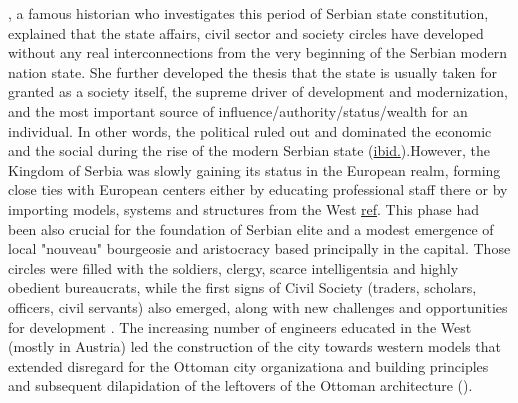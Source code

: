 \documentclass[11pt]{report}
\begin{document}
\href{Stojanovic}{\cite{stojanovic_ulje_2010}}, a famous historian who investigates this period of Serbian state constitution, explained that the state affairs, civil sector and society circles have developed without any real interconnections from the very beginning of the Serbian modern nation state. She further developed the thesis that the state is usually taken for granted as a society itself, the supreme driver of development and modernization, and the most important source of influence/authority/status/wealth for an individual. In other words, the political ruled out and dominated the economic and the social during the rise of the modern Serbian state (\href{Stojanovic}{ibid.}).\footnotemark However, the Kingdom of Serbia was slowly gaining its status in the European realm, forming close ties with European centers either by educating professional staff there or by importing models, systems and structures from the West \href{}{ref}. This phase had been also crucial for the foundation of Serbian elite and a modest emergence of local "nouveau" bourgeosie and aristocracy based principally in the capital.
Those circles were filled with the soldiers, clergy, scarce intelligentsia and highly obedient bureaucrats, while the  first  signs  of  Civil  Society (traders, scholars, officers, civil servants) also emerged, along with new challenges and  opportunities  for  development \href{}{\citealt{vukmirovic_city_2013}}.
The increasing number of engineers educated in the West (mostly in 
Austria) led the construction of the city towards western models that extended disregard for the Ottoman city organizationa and building principles and subsequent dilapidation of the leftovers of the Ottoman architecture (\href{}{\citealt{blagojevic_urban_2009}}).
\\
\end{document}
